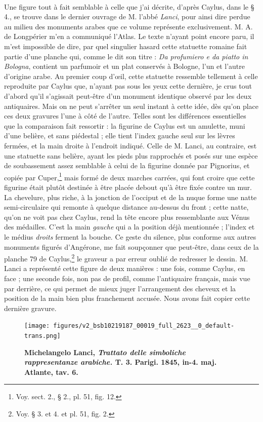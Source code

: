 \documentclass[a4paper, 11pt, oneside, polutonikogreek, french]{article}
\begin{document}
\paragraph{}
Une figure tout à fait semblable à celle que j'ai décrite, d'après Caylus, dans le § 4., se trouve dans le dernier ouvrage de M. l'abbé \emph{Lanci}, pour ainsi dire perdue au milieu des monuments arabes que ce volume représente exclusivement. M. A. de Longpérier m'en a communiqué l'Atlas. Le texte n'ayant point encore paru, il m'est impossible de dire, par quel singulier hasard cette statuette romaine fait partie d'une planche qui, comme le dit son titre : \emph{Da profumiero e da piatto in Bologna}, contient un parfumoir et un plat conservés à Bologne, l'un et l'autre d'origine arabe. Au premier coup d'œil, cette statuette ressemble tellement à celle reproduite par Caylus que, n'ayant pas sous les yeux cette dernière, je crus tout d'abord qu'il s'agissait peut-être d'un monument identique observé par les deux antiquaires. Mais on ne peut s'arrêter un seul instant à cette idée, dès qu'on place ces deux gravures l'une à côté de l'autre. Telles sont les différences essentielles que la comparaison fait ressortir : la figurine de Caylus est un amulette, muni d'une belière, et sans piédestal ; elle tient l'index gauche seul sur les lèvres fermées, et la main droite à l'endroit indiqué. Celle de M. Lanci, au contraire, est une statuette sans belière, ayant les pieds plus rapprochés et posés sur une espèce de soubassement assez semblable à celui de la figurine donnée par Pignorius, et copiée par Cuper,\footnote{Voy. sect. 2., § 2., pl. 51, fig. 12.} mais formé de deux marches carrées, qui font croire que cette figurine était plutôt destinée à être placée debout qu'à être fixée contre un mur. La chevelure, plus riche, à la jonction de l'occiput et de la nuque forme une natte semi-circulaire qui remonte à quelque distance au-dessus du front ; cette natte, qu'on ne voit pas chez Caylus, rend la tête encore plus ressemblante aux Vénus des médailles. C'est la main \emph{gauche} qui a la position déjà mentionnée ; l'index et le médius \emph{droits} ferment la bouche. Ce geste du silence, plus conforme aux autres monuments figurés d'Angérone, me fait soupçonner que peut-être, dans ceux de la planche 79 de Caylus,\footnote{Voy. § 3. et 4. et pl. 51, fig. 2.} le graveur a par erreur oublié de redresser le dessin. M. Lanci a représenté cette figure de deux manières : une fois, comme Caylus, en face ; une seconde fois, non pas de profil, comme l'antiquaire français, mais vue par derrière, ce qui permet de mieux juger l'arrangement des cheveux et la position de la main bien plus franchement accusée. Nous avons fait copier cette dernière gravure.
\clearpage
\vspace*{\fill}
\begin{figure}[H]
\centering
\texttt{[image: figures/v2\_bsb10219187\_00019\_full\_2623\_\_0\_default-trans.png]}
\caption{\bfseries Michelangelo Lanci, \emph{Trattato delle simboliche rappresentanze arabiche.} T. 3. Parigi. 1845, in-4. maj. Atlante, tav. 6.}
\end{figure}
\vspace*{\fill}
\clearpage
\end{document}
